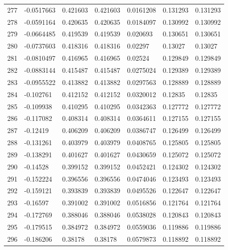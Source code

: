 \begin{longtable}{l|lll|lll}
 277 & -0.0517663   & 0.421603    & 0.421603    &  0.0161208   & 0.131293    & 0.131293    \\
 278 & -0.0591164   & 0.420635    & 0.420635    &  0.0184097   & 0.130992    & 0.130992    \\
 279 & -0.0664485   & 0.419539    & 0.419539    &  0.020693    & 0.130651    & 0.130651    \\
 280 & -0.0737603   & 0.418316    & 0.418316    &  0.02297     & 0.13027     & 0.13027     \\
 281 & -0.0810497   & 0.416965    & 0.416965    &  0.02524     & 0.129849    & 0.129849    \\
 282 & -0.0883144   & 0.415487    & 0.415487    &  0.0275024   & 0.129389    & 0.129389    \\
 283 & -0.0955522   & 0.413882    & 0.413882    &  0.0297563   & 0.128889    & 0.128889    \\
 284 & -0.102761    & 0.412152    & 0.412152    &  0.0320012   & 0.12835     & 0.12835     \\
 285 & -0.109938    & 0.410295    & 0.410295    &  0.0342363   & 0.127772    & 0.127772    \\
 286 & -0.117082    & 0.408314    & 0.408314    &  0.0364611   & 0.127155    & 0.127155    \\
 287 & -0.12419     & 0.406209    & 0.406209    &  0.0386747   & 0.126499    & 0.126499    \\
 288 & -0.131261    & 0.403979    & 0.403979    &  0.0408765   & 0.125805    & 0.125805    \\
 289 & -0.138291    & 0.401627    & 0.401627    &  0.0430659   & 0.125072    & 0.125072    \\
 290 & -0.14528     & 0.399152    & 0.399152    &  0.0452421   & 0.124302    & 0.124302    \\
 291 & -0.152224    & 0.396556    & 0.396556    &  0.0474046   & 0.123493    & 0.123493    \\
 292 & -0.159121    & 0.393839    & 0.393839    &  0.0495526   & 0.122647    & 0.122647    \\
 293 & -0.16597     & 0.391002    & 0.391002    &  0.0516856   & 0.121764    & 0.121764    \\
 294 & -0.172769    & 0.388046    & 0.388046    &  0.0538028   & 0.120843    & 0.120843    \\
 295 & -0.179515    & 0.384972    & 0.384972    &  0.0559036   & 0.119886    & 0.119886    \\
 296 & -0.186206    & 0.38178     & 0.38178     &  0.0579873   & 0.118892    & 0.118892    \\

\end{longtable}
